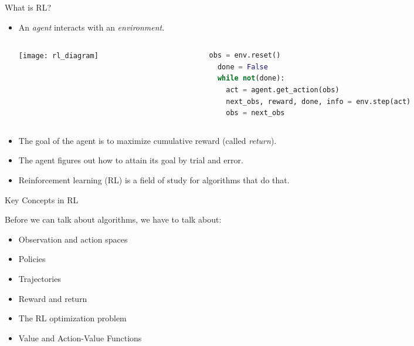
\begin{frame}[fragile]{What is RL?}

\begin{itemize}
\item An \textit{agent} interacts with an \textit{environment}. 
\begin{columns}
\begin{column}{0.5\textwidth}
    \begin{center}
     \texttt{[image: rl\_diagram]}
     \end{center}
\end{column}
\begin{column}{0.5\textwidth}  %
\begin{lstlisting}[language=python]
  obs = env.reset()
  done = False
  while not(done):
  	act = agent.get_action(obs)
  	next_obs, reward, done, info = env.step(act)
  	obs = next_obs
\end{lstlisting}
\end{column}
\end{columns}
\item The goal of the agent is to maximize cumulative reward (called \textit{return}). 
\item The agent figures out how to attain its goal by trial and error.
\item Reinforcement learning (RL) is a field of study for algorithms that do that.
\end{itemize}

\end{frame}


\begin{frame}{Key Concepts in RL}

Before we can talk about algorithms, we have to talk about:
\begin{itemize}
\item Observation and action spaces
\item Policies
\item Trajectories
\item Reward and return
\item The RL optimization problem
\item Value and Action-Value Functions
\end{itemize}

\end{frame}

